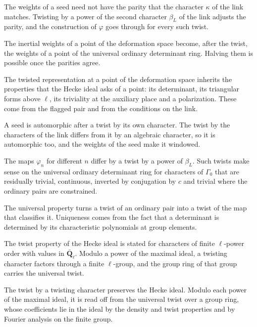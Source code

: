 The weights of a seed need not have the parity that the character $\kappa$ of the link matches. Twisting by a power of the second character $\beta_L$ of the link adjusts the parity, and the construction of $\varphi$ goes through for every such twist.

The inertial weights of a point of the deformation space become, after the twist, the weights of a point of the universal ordinary determinant ring. Halving them is possible once the parities agree.

The twisted representation at a point of the deformation space inherits the properties that the Hecke ideal asks of a point: its determinant, its triangular forms above $\ell$, its triviality at the auxiliary place and a polarization. These come from the flagged pair and from the conditions on the link.

A seed is automorphic after a twist by its own character. The twist by the characters of the link differs from it by an algebraic character, so it is automorphic too, and the weights of the seed make it windowed.

The maps $\varphi_n$ for different $n$ differ by a twist by a power of $\beta_L$. Such twists make sense on the universal ordinary determinant ring for characters of $\Gamma_0$ that are residually trivial, continuous, inverted by conjugation by $c$ and trivial where the ordinary pairs are constrained.

The universal property turns a twist of an ordinary pair into a twist of the map that classifies it. Uniqueness comes from the fact that a determinant is determined by its characteristic polynomials at group elements.

The twist property of the Hecke ideal is stated for characters of finite $\ell$-power order with values in $\bar{\mathbf Q}_\ell$. Modulo a power of the maximal ideal, a twisting character factors through a finite $\ell$-group, and the group ring of that group carries the universal twist.

The twist by a twisting character preserves the Hecke ideal. Modulo each power of the maximal ideal, it is read off from the universal twist over a group ring, whose coefficients lie in the ideal by the density and twist properties and by Fourier analysis on the finite group.

